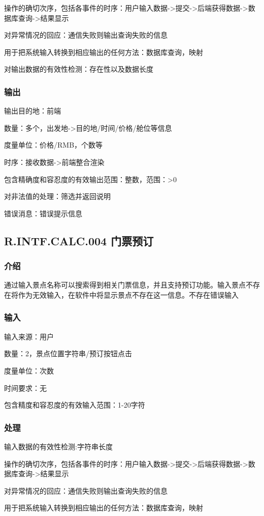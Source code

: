 	操作的确切次序，包括各事件的时序：用户输入数据->提交->后端获得数据->数据库查询->结果显示

	对异常情况的回应：通信失败则输出查询失败的信息

	用于把系统输入转换到相应输出的任何方法：数据库查询，映射

	对输出数据的有效性检测：存在性以及数据长度
\subsubsection{输出}
		输出目的地：前端

		数量：多个，出发地->目的地/时间/价格/舱位等信息

		度量单位：价格/RMB，个数等

		时序：接收数据->前端整合渲染

		包含精确度和容忍度的有效输出范围：整数，范围：>0

		对非法值的处理：筛选并返回说明

		错误消息：错误提示信息




\subsection{R.INTF.CALC.004 门票预订}
\subsubsection{介绍}
通过输入景点名称可以搜索得到相关门票信息，并且支持预订功能。输入景点不存在将作为无效输入，在软件中将显示景点不存在这一信息。不存在错误输入
\subsubsection{输入}
		输入来源：用户

		数量：2，景点位置字符串/预订按钮点击

		度量单位：次数

		时间要求：无

		包含精度和容忍度的有效输入范围：1-20字符
\subsubsection{处理}
	输入数据的有效性检测:字符串长度

	操作的确切次序，包括各事件的时序：用户输入数据->提交->后端获得数据->数据库查询->结果显示

	对异常情况的回应：通信失败则输出查询失败的信息

	用于把系统输入转换到相应输出的任何方法：数据库查询，映射

